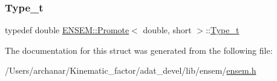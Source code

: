 \subsubsection{\texorpdfstring{Type\_t}{Type\_t}\hspace{0.1cm}{\footnotesize\ttfamily [2/2]}}
{\footnotesize\ttfamily typedef double \mbox{\hyperlink{structENSEM_1_1Promote}{E\+N\+S\+E\+M\+::\+Promote}}$<$ double, short $>$\+::\mbox{\hyperlink{structENSEM_1_1Promote_3_01double_00_01short_01_4_add06e396481b481fe69ed962df8e530a}{Type\+\_\+t}}}



The documentation for this struct was generated from the following file\+:\begin{DoxyCompactItemize}
\item 
/\+Users/archanar/\+Kinematic\+\_\+factor/adat\+\_\+devel/lib/ensem/\mbox{\hyperlink{lib_2ensem_2ensem_8h}{ensem.\+h}}\end{DoxyCompactItemize}
